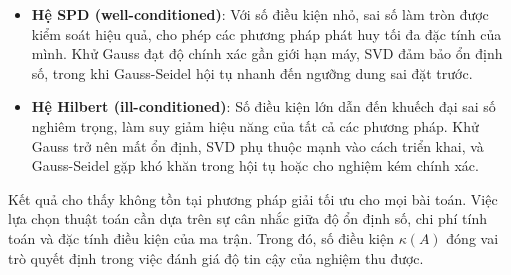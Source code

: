 \begin{itemize}[topsep=0pt, itemsep=2.5pt, leftmargin=1.5cm]
    \item \textbf{Hệ SPD (well-conditioned)}: Với số điều kiện nhỏ, sai số làm tròn được kiểm soát hiệu quả, cho phép các phương pháp phát huy tối đa đặc tính của mình. Khử Gauss đạt độ chính xác gần giới hạn máy, SVD đảm bảo ổn định số, trong khi Gauss-Seidel hội tụ nhanh đến ngưỡng dung sai đặt trước.
    \item \textbf{Hệ Hilbert (ill-conditioned)}: Số điều kiện lớn dẫn đến khuếch đại sai số nghiêm trọng, làm suy giảm hiệu năng của tất cả các phương pháp. Khử Gauss trở nên mất ổn định, SVD phụ thuộc mạnh vào cách triển khai, và Gauss-Seidel gặp khó khăn trong hội tụ hoặc cho nghiệm kém chính xác.
\end{itemize}

Kết quả cho thấy không tồn tại phương pháp giải tối ưu cho mọi bài toán. Việc lựa chọn thuật toán cần dựa trên sự cân nhắc giữa độ ổn định số, chi phí tính toán và đặc tính điều kiện của ma trận. Trong đó, số điều kiện $\kappa(A)$ đóng vai trò quyết định trong việc đánh giá độ tin cậy của nghiệm thu được.
